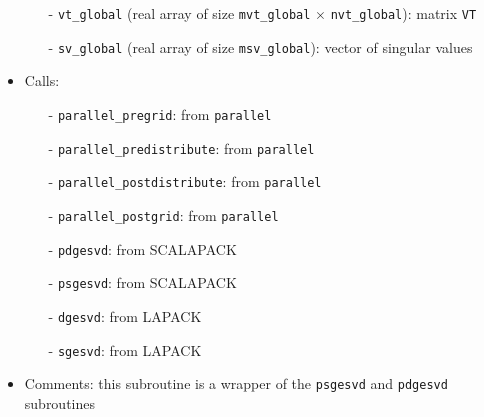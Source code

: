 \documentclass[12pt]{article}
\begin{document}
\begin{itemize}
\begin{itemize}
\item[-] {\tt vt\_global} (real array of size {\tt mvt\_global} $\times$ {\tt nvt\_global}): matrix {\tt VT} 
\item[-] {\tt sv\_global} (real array of size {\tt msv\_global}): vector of singular values 
\end{itemize}
\item Calls: 
\begin{itemize}
\item[-] {\tt parallel\_pregrid}: from {\tt parallel}
\item[-] {\tt parallel\_predistribute}: from {\tt parallel}
\item[-] {\tt parallel\_postdistribute}: from {\tt parallel}
\item[-] {\tt parallel\_postgrid}: from {\tt parallel}
\item[-] {\tt pdgesvd}: from SCALAPACK
\item[-] {\tt psgesvd}: from SCALAPACK
\item[-] {\tt dgesvd}: from LAPACK
\item[-] {\tt sgesvd}: from LAPACK
\end{itemize}
\item Comments: this subroutine is a wrapper of the {\tt psgesvd} and {\tt pdgesvd} subroutines
\end{itemize} 
\end{document}
